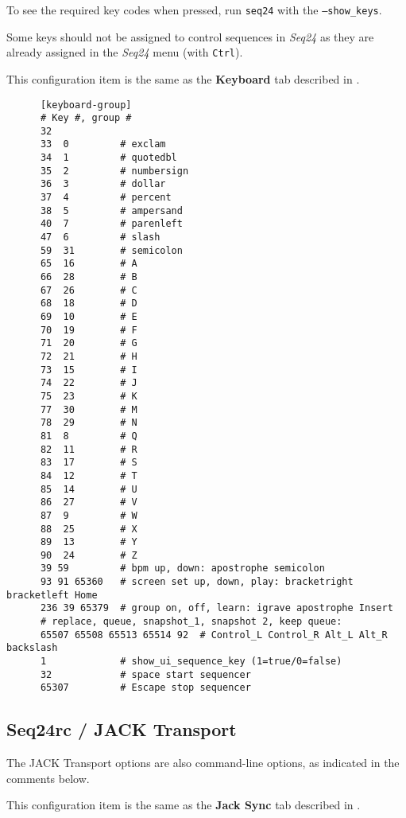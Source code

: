	To see the required key codes when pressed, run \texttt{seq24} with
   the \texttt{--show\_keys}.

   Some keys should not be assigned to control sequences in \textsl{Seq24} as
   they are already assigned in the \textsl{Seq24} menu (with \texttt{Ctrl}). 

   This configuration item is the same as the 
   \textbf{Keyboard} tab described in
   .

   \begin{verbatim}
      [keyboard-group]
      # Key #, group # 
      32
      33  0         # exclam
      34  1         # quotedbl
      35  2         # numbersign
      36  3         # dollar
      37  4         # percent
      38  5         # ampersand
      40  7         # parenleft
      47  6         # slash
      59  31        # semicolon
      65  16        # A
      66  28        # B
      67  26        # C
      68  18        # D
      69  10        # E
      70  19        # F
      71  20        # G
      72  21        # H
      73  15        # I
      74  22        # J
      75  23        # K
      77  30        # M
      78  29        # N
      81  8         # Q
      82  11        # R
      83  17        # S
      84  12        # T
      85  14        # U
      86  27        # V
      87  9         # W
      88  25        # X
      89  13        # Y
      90  24        # Z
      39 59         # bpm up, down: apostrophe semicolon
      93 91 65360   # screen set up, down, play: bracketright bracketleft Home
      236 39 65379  # group on, off, learn: igrave apostrophe Insert
      # replace, queue, snapshot_1, snapshot 2, keep queue:
      65507 65508 65513 65514 92  # Control_L Control_R Alt_L Alt_R backslash
      1             # show_ui_sequence_key (1=true/0=false)
      32            # space start sequencer
      65307         # Escape stop sequencer
   \end{verbatim}

\subsection{Seq24rc / JACK Transport}
\label{subsec:seq24_rc_file_jack_transport}

   The JACK Transport options are also command-line options, as indicated in
   the comments below.

   This configuration item is the same as the 
   \textbf{Jack Sync} tab described in
   .

